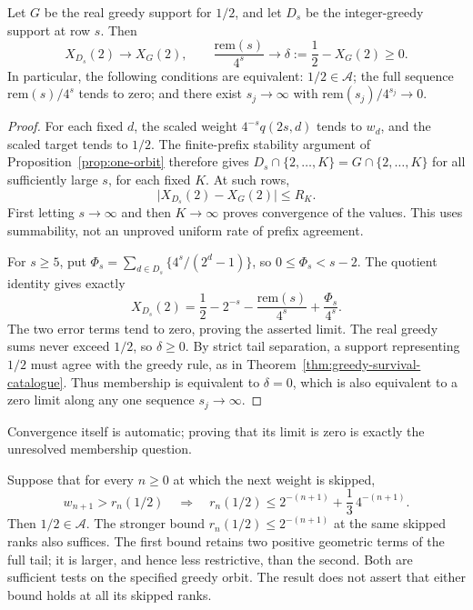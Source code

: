 \begin{thm}
\label{thm:seam-limit}
Let $G$ be the real greedy support for $1/2$, and let $D_s$ be the
integer-greedy support at row $s$.  Then
\[
 X_{D_s}(2)\longrightarrow X_G(2),\qquad
 \frac{\mathrm{rem}(s)}{4^s}\longrightarrow
 \delta:=\frac12-X_G(2)\ge0.
\]
In particular, the following conditions are equivalent: $1/2\in\mathcal A$;
the full sequence $\mathrm{rem}(s)/4^s$ tends to zero; and there
exist $s_j\to\infty$ with $\mathrm{rem}(s_j)/4^{s_j}\to0$.
\end{thm}
\begin{proof}
For each fixed $d$, the scaled weight
$4^{-s}q(2s,d)$ tends to $w_d$, and the scaled target tends to
$1/2$.  The finite-prefix stability argument of
Proposition~\ref{prop:one-orbit} therefore gives
$D_s\cap\{2,\ldots,K\}=G\cap\{2,\ldots,K\}$ for all sufficiently
large $s$, for each fixed $K$.  At such rows,
\[
 \bigl|X_{D_s}(2)-X_G(2)\bigr|\le R_K.
\]
First letting $s\to\infty$ and then $K\to\infty$ proves convergence
of the values.  This uses summability, not an unproved uniform
rate of prefix agreement.

For $s\ge5$, put
$\Phi_s=\sum_{d\in D_s}\{4^s/(2^d-1)\}$, so
$0\le\Phi_s<s-2$.  The quotient identity gives exactly
\[
 X_{D_s}(2)=\frac12-2^{-s}
            -\frac{\mathrm{rem}(s)}{4^s}+\frac{\Phi_s}{4^s}.
\]
The two error terms tend to zero, proving the asserted limit.
The real greedy sums never exceed $1/2$, so $\delta\ge0$.
By strict tail separation, a support representing $1/2$ must agree
with the greedy rule, as in Theorem~\ref{thm:greedy-survival-catalogue}.
Thus membership is equivalent to $\delta=0$, which is also equivalent
to a zero limit along any one sequence $s_j\to\infty$.
\end{proof}
Convergence itself is automatic; proving that its limit is zero is
exactly the unresolved membership question.

\begin{thm}
\label{thm:two-channel-cap}
Suppose that for every $n\ge0$ at which the next weight is skipped,
\[
 w_{n+1}>r_n(1/2)\quad\Longrightarrow\quad
 r_n(1/2)\le 2^{-(n+1)}+\frac13\,4^{-(n+1)}.
\]
Then $1/2\in\mathcal A$.  The stronger bound
$r_n(1/2)\le2^{-(n+1)}$ at the same skipped ranks also suffices.
The first bound retains two positive geometric terms of the full tail;
it is larger, and hence less restrictive, than the second.  Both are
sufficient tests on the specified greedy orbit.  The result does not
assert that either bound holds at all its skipped ranks.
\end{thm}

